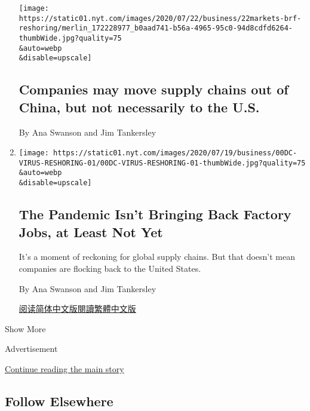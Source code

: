 \begin{enumerate}
  \texttt{[image: https://static01.nyt.com/images/2020/07/22/business/22markets-brf-reshoring/merlin\_172228977\_b0aad741-b56a-4965-95c0-94d8cdfd6264-thumbWide.jpg?quality=75\\\&auto=webp\\\&disable=upscale]}

  \hypertarget{companies-may-move-supply-chains-out-of-china-but-not-necessarily-to-the-us}{%
  \subsection{Companies may move supply chains out of China, but not
  necessarily to the
  U.S.}\label{companies-may-move-supply-chains-out-of-china-but-not-necessarily-to-the-us}}

  By Ana Swanson and Jim Tankersley
\item
  \href{/2020/07/22/business/economy/coronavirus-globalization-jobs-supply-chain-china.html}{}

  \texttt{[image: https://static01.nyt.com/images/2020/07/19/business/00DC-VIRUS-RESHORING-01/00DC-VIRUS-RESHORING-01-thumbWide.jpg?quality=75\\\&auto=webp\\\&disable=upscale]}

  \hypertarget{the-pandemic-isnt-bringing-back-factory-jobs-at-least-not-yet}{%
  \subsection{The Pandemic Isn't Bringing Back Factory Jobs, at Least
  Not
  Yet}\label{the-pandemic-isnt-bringing-back-factory-jobs-at-least-not-yet}}

  It's a moment of reckoning for global supply chains. But that doesn't
  mean companies are flocking back to the United States.

  By Ana Swanson and Jim Tankersley

  \href{https://cn.nytimes.com/business/20200723/coronavirus-globalization-jobs-supply-chain-china/}{阅读简体中文版}\href{https://cn.nytimes.com/business/20200723/coronavirus-globalization-jobs-supply-chain-china/zh-hant/}{閱讀繁體中文版}
\end{enumerate}

Show More

Advertisement

\protect\hyperlink{after-mid2}{Continue reading the main story}

\hypertarget{follow-elsewhere}{%
\subsection{Follow Elsewhere}\label{follow-elsewhere}}


